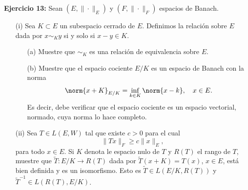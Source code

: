 \textbf{Ejercicio 13:} Sean $(E,\|\cdot\|_E)$ y $(F,\|\cdot\|_F)$ espacios de Banach.
\begin{itemize}
    \item[(i)] Sea $K\subset E$ un subespacio cerrado de $E$. Definimos la relación sobre $E$ dada por $x\sim_K y$ si y solo si $x-y\in K$.
    \begin{itemize}
        \item[(a)] Muestre que $\sim_K$ es una relación de equivalencia sobre $E$.
        \item[(b)] Muestre que el espacio cociente $E/K$ es un espacio de Banach con la norma
        $$\norm{x+K}_{E/K} = \inf_{k\in K} \norm{x-k}, \quad x\in E.$$
        Es decir, debe verificar que el espacio cociente es un espacio vectorial, normado, cuya norma lo hace completo.
    \end{itemize}
    \item[(ii)] Sea $T\in L(E,W)$ tal que existe $c>0$ para el cual
    $$\|Tx\|_F \geq c \|x\|_E,$$
    para todo $x\in E$. Si $K$ denota le espacio nulo de $T$ y $R(T)$ el rango de $T$, muestre que $\widetilde{T}:E/K\to R(T)$ dada por $\widetilde{T}(x+K)=T(x)$, $x\in E$, está bien definida y es un isomorfismo. Esto es $\widetilde{T}\in L(E/K,R(T))$ y $\widetilde{T}^{-1}\in L(R(T),E/K)$.
\end{itemize}

